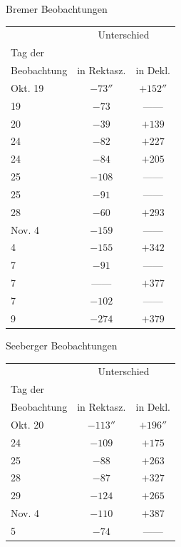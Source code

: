 \begin{center}Bremer Beobachtungen\end{center}
\begin{center}\fontsize{10}{12}\selectfont\setlength{\tabcolsep}{8pt}\renewcommand{\arraystretch}{1.15}\begin{tabular}{l|c|c}
& \multicolumn{2}{c}{Unterschied} \\
Tag der & & \\
Beobachtung & in Rektasz. & in Dekl. \\ \hline
Okt. 19 & $-73''$ 
 & $+152''$ \\
19 & $-73$ & ---\;--- \\
20 & $-39$ & $+139$ \\
24 & $-82$ & $+227$ \\
24 & $-84$ & $+205$ \\
25 & $-108$ & ---\;--- \\
25 & $-91$ & ---\;--- \\
28 & $-60$ & $+293$ \\
Nov. 4 & $-159$ & ---\;--- \\
4 & $-155$ & $+342$ \\
7 & $-91$ & ---\;--- \\
7 & ---\;--- & $+377$ \\
7 & $-102$ & ---\;--- \\
9 & $-274$ & $+379$ \\
\end{tabular}\end{center}
\begin{center}Seeberger Beobachtungen\end{center}
\begin{center}\fontsize{10}{12}\selectfont\setlength{\tabcolsep}{8pt}\renewcommand{\arraystretch}{1.15}\begin{tabular}{l|c|c}
& \multicolumn{2}{c}{Unterschied} \\
Tag der & & \\
Beobachtung & in Rektasz. & in Dekl. \\ \hline
Okt. 20 & $-113''$ & $+196''$ \\
24 & $-109$ & $+175$ \\
25 & $-88$ & $+263$ \\
28 & $-87$ & $+327$ \\
29 & $-124$ & $+265$ \\
Nov. 4 & $-110$ & $+387$ \\
5 & $-74$ & ---\;--- \\
\end{tabular}\end{center}


